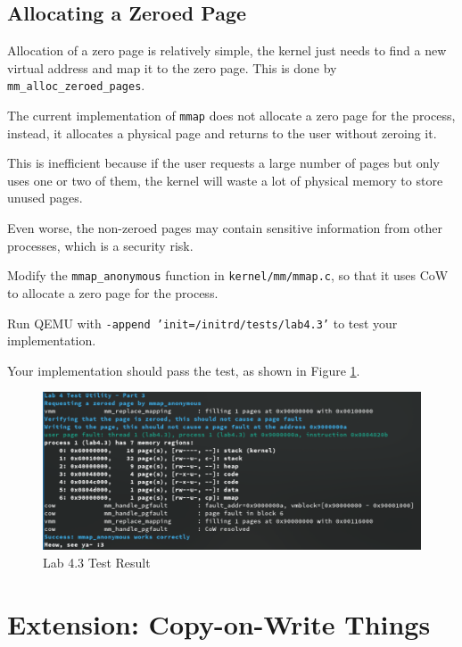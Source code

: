 \subsection{Allocating a Zeroed Page}

Allocation of a zero page is relatively simple, the kernel just needs to
find a new virtual address and map it to the zero page. This is done by
\texttt{mm\_alloc\_zeroed\_pages}.

The current implementation of \texttt{mmap} does not allocate a zero page
for the process, instead, it allocates a physical page and returns to
the user without zeroing it.

This is inefficient because if the user requests a large number of pages but
only uses one or two of them, the kernel will waste a lot of physical memory
to store unused pages.

Even worse, the non-zeroed pages may contain sensitive information from
other processes, which is a security risk.

\begin{exercise}
    \item Modify the \texttt{mmap\_anonymous} function in \texttt{kernel/mm/mmap.c},
    so that it uses CoW to allocate a zero page for the process.
    \item Run QEMU with \texttt{-append 'init=/initrd/tests/lab4.3'} to test your
    implementation.

    Your implementation should pass the test, as shown in Figure \ref{fig:lab4.3}.

    \begin{figure}[H]
        \centering
        \includegraphics[width=0.8\linewidth]{assets/c4.mmap.png}
        \caption{Lab 4.3 Test Result}
        \label{fig:lab4.3}
    \end{figure}
\end{exercise}

\section{Extension: Copy-on-Write Things}

